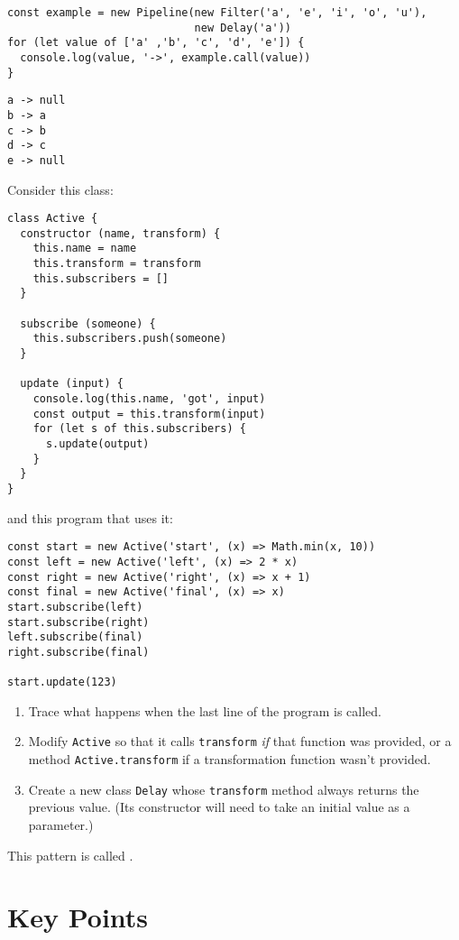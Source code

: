 \begin{verbatim}
const example = new Pipeline(new Filter('a', 'e', 'i', 'o', 'u'),
                             new Delay('a'))
for (let value of ['a' ,'b', 'c', 'd', 'e']) {
  console.log(value, '->', example.call(value))
}
\end{verbatim}

\begin{verbatim}
a -> null
b -> a
c -> b
d -> c
e -> null
\end{verbatim}


Consider this class:

\begin{verbatim}
class Active {
  constructor (name, transform) {
    this.name = name
    this.transform = transform
    this.subscribers = []
  }

  subscribe (someone) {
    this.subscribers.push(someone)
  }

  update (input) {
    console.log(this.name, 'got', input)
    const output = this.transform(input)
    for (let s of this.subscribers) {
      s.update(output)
    }
  }
}
\end{verbatim}

\noindent
and this program that uses it:

\begin{verbatim}
const start = new Active('start', (x) => Math.min(x, 10))
const left = new Active('left', (x) => 2 * x)
const right = new Active('right', (x) => x + 1)
const final = new Active('final', (x) => x)
start.subscribe(left)
start.subscribe(right)
left.subscribe(final)
right.subscribe(final)

start.update(123)
\end{verbatim}

\begin{enumerate}
\item
  Trace what happens when the last line of the program is called.
\item
  Modify \texttt{Active} so that it calls \texttt{transform} \emph{if} that function was provided,
  or a method \texttt{Active.transform} if a transformation function wasn't provided.
\item
  Create a new class \texttt{Delay} whose \texttt{transform} method always returns the previous value.
  (Its constructor will need to take an initial value as a parameter.)
\end{enumerate}

This pattern is called .

\section*{Key Points}


